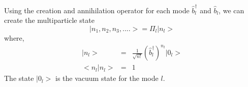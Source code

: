 \documentclass{article}
\begin{document}
Using the creation and annihilation operator for each mode $\hat{b}_l ^\dagger$ and $\hat{b}_l$, we can create the multiparticle state
\begin{equation*}
    | n_1, n_2, n_3, .... > = \Pi_l |n_l> 
\end{equation*}
where, 
\begin{eqnarray*}
    |n_l> &=& \frac{1}{\sqrt{n!}} \left( \hat{b} _l ^\dagger \right)^{n_l} |0_l>  \\
    <n_l|n_l> &=& 1
\end{eqnarray*}
The state $|0_l>$ is the vacuum state for the mode $l$. 
\end{document}
